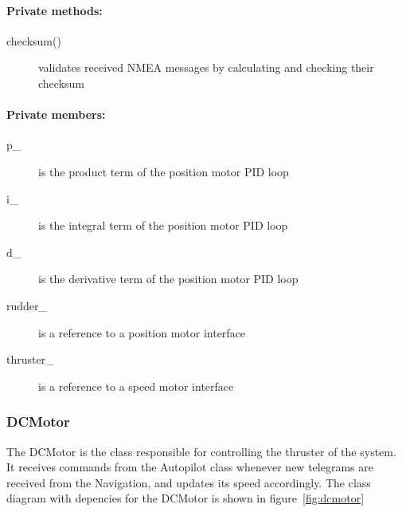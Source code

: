 \paragraph{Private methods:}
\begin{adjustwidth}{2.5em}{0pt}\begin{description}
		\item [checksum()] validates received NMEA messages by calculating and checking their checksum
\end{description}\end{adjustwidth}

\paragraph{Private members:}
\begin{adjustwidth}{2.5em}{0pt}\begin{description}
		\item [p_] is the product term of the position motor PID loop
		\item [i_] is the integral term of the position motor PID loop
		\item [d_] is the derivative term of the position motor PID loop
		\item [rudder_] is a reference to a position motor interface
		\item [thruster_] is a reference to a speed motor interface
\end{description}\end{adjustwidth}

\subsubsection{DCMotor}
The DCMotor is the class responsible for controlling the thruster of the system. It receives commands from the Autopilot class whenever new telegrams are received from the Navigation, and updates its speed accordingly. The class diagram with depencies for the DCMotor is shown in figure~\ref{fig:dcmotor}

